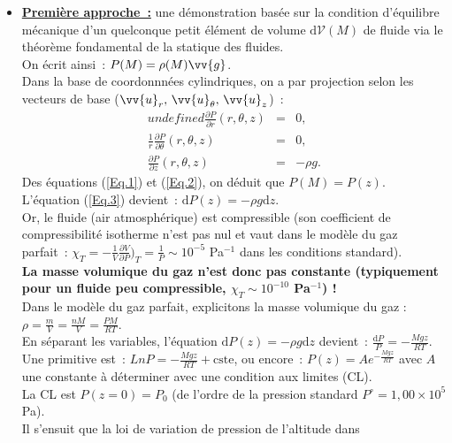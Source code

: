 \documentclass{article}
\renewcommand\overrightarrow{\vv}
\let\grad\relax
\DeclareMathOperator{\grad}{\overrightarrow{\mathrm{grad}}}
\begin{document}
\begin{itemize}
\item \underline{\textbf{Première approche :}} une démonstration basée sur la condition d'équilibre mécanique
d'un quelconque petit élément de volume $\mathrm{d}\mathcal{V}(M)$ de fluide
via le théorème fondamental de la statique des fluides. \\
On écrit ainsi : $\grad P(M) =
\rho(M)\overrightarrow{g}$. \\
Dans la base de coordonnnées cylindriques, on a par projection selon
les vecteurs de base ($\overrightarrow{u}_{r},\,
\overrightarrow{u}_{\mathrm{\theta}},\,\overrightarrow{u}_{z}$) :
\begin{eqnarray}undefined
\frac{\partial P}{\partial r}\left(r,\theta,z\right) &=& 0, \label{Eq.1} \\
\frac{1}{r}\frac{\partial P}{\partial \theta}\left(r,\theta,z\right) &=& 0, \label{Eq.2} \\
\frac{\partial P}{\partial z}\left(r,\theta,z\right) &=& -\rho g. \label{Eq.3}
\end{eqnarray}
Des équations (\ref{Eq.1}) et (\ref{Eq.2}), on déduit que $P(M) =
P(z)$. \\
L'équation (\ref{Eq.3}) devient : $\mathrm{d}P(z) = -\rho g \mathrm{d}z$. \\
Or, le fluide (air atmosphérique) est compressible (son coefficient
de compressibilité isotherme n'est pas nul et vaut dans le modèle du
gaz parfait : $\chi_{T} = -\frac{1}{V}\frac{\partial V}{\partial
P})_{T} = \frac{1}{P} \sim 10^{-5}$ Pa$^{-1}$ dans les conditions
standard).
\\
\textbf{La masse volumique du gaz n'est donc pas constante
(typiquement pour un fluide peu compressible, $\chi_{T} \sim
10^{-10}$ Pa$^{-1}$) !}
\\
Dans le modèle du gaz parfait, explicitons la masse volumique du gaz
: $\rho = \frac{m}{V} = \frac{nM}{V} =
\frac{PM}{RT}$. \\
En séparant les variables, l'équation $\mathrm{d}P(z) = -\rho g \mathrm{d}z$ devient :
$\frac{\mathrm{d}P}{P} = -\frac{Mgz}{RT}$. \\
Une primitive est : $Ln  P = -\frac{Mgz}{RT}+\mathrm{cste}$, ou encore :
$P(z) = Ae^{-\frac{Mgz}{RT}}$ avec $A$ une constante à déterminer
avec une condition aux limites (CL). \\
La CL est $P(z=0) = P_{0}$ (de l'ordre de la pression standard
$P^{\circ} = 1,00\times 10^{5}$ Pa). \\
Il s'ensuit que la loi de variation de pression de l'altitude dans

\end{itemize}
\end{document}
